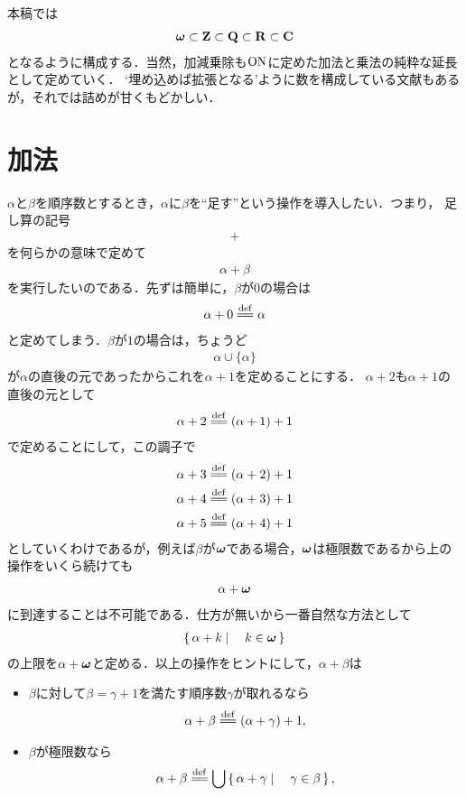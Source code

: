 本稿では
\begin{align}
	{\boldsymbol \omega} \subset \mathbf{Z} \subset \mathbf{Q} \subset \mathbf{R} \subset \mathbf{C}
\end{align}
となるように構成する．当然，加減乗除も$\mathrm{ON}$に定めた加法と乗法の純粋な延長として定めていく．
`埋め込めば拡張となる'ように数を構成している文献もあるが，それでは詰めが甘くもどかしい．

\section{加法}
	$\alpha$と$\beta$を順序数とするとき，$\alpha$に$\beta$を``足す''という操作を導入したい．つまり，
	足し算の記号
	\begin{align}
		+
	\end{align}
	を何らかの意味で定めて
	\begin{align}
		\alpha + \beta
	\end{align}
	を実行したいのである．先ずは簡単に，$\beta$が$0$の場合は
	\begin{align}
		\alpha + 0 \defeq \alpha
	\end{align}
	と定めてしまう．$\beta$が$1$の場合は，ちょうど
	\begin{align}
		\alpha \cup \{\alpha\}
	\end{align}
	が$\alpha$の直後の元であったからこれを$\alpha + 1$を定めることにする．
	$\alpha + 2$も$\alpha + 1$の直後の元として
	\begin{align}
		\alpha + 2 \defeq (\alpha + 1) + 1
	\end{align}
	で定めることにして，この調子で
	\begin{align}
		&\alpha + 3 \defeq (\alpha + 2) + 1 \\
		&\alpha + 4 \defeq (\alpha + 3) + 1 \\
		&\alpha + 5 \defeq (\alpha + 4) + 1
	\end{align}
	としていくわけであるが，例えば$\beta$が${\boldsymbol \omega}$である場合，${\boldsymbol \omega}$は極限数であるから上の操作をいくら続けても
	\begin{align}
		\alpha + {\boldsymbol \omega}
	\end{align}
	に到達することは不可能である．仕方が無いから一番自然な方法として
	\begin{align}
		\left\{\, \alpha + k \mid \quad k \in {\boldsymbol \omega}\, \right\}
	\end{align}
	の上限を$\alpha + {\boldsymbol \omega}$と定める．以上の操作をヒントにして，$\alpha + \beta$は
	\begin{itemize}
		\item $\beta$に対して$\beta = \gamma + 1$を満たす順序数$\gamma$が取れるなら
			\begin{align}
				\alpha + \beta \defeq (\alpha + \gamma) + 1,
			\end{align}
		
		\item $\beta$が極限数なら
			\begin{align}
				\alpha + \beta \defeq \bigcup \Set{\alpha + \gamma}{\gamma \in \beta},
			\end{align}
	\end{itemize}
